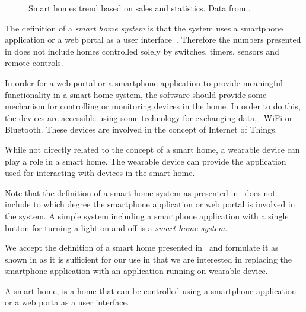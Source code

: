 \begin{figure}[!hbt]
  \centering
  
  \caption{Smart homes trend based on sales and statistics. Data from \protect\cite{SMARTHOMETREND}.}
  \label{fig:smarthomestrend}
\end{figure}

The definition of a \emph{smart home system} is  that the system uses a smartphone application or a web portal as a user interface~\cite{SMARTHOMETREND}. Therefore the numbers presented in  does not include homes controlled solely by switches, timers, sensors and remote controls.

In order for a web portal or a smartphone application to provide meaningful functionality in a smart home system, the software should provide some mechanism for controlling or monitoring devices in the home. In order to do this, the devices are accessible using some technology for exchanging data, \eg~WiFi or Bluetooth. These devices are involved in the concept of Internet of Things. 

While not directly related to the concept of a smart home, a wearable device can play a role in a smart home. The wearable device can provide the application used for interacting with devices in the smart home.

Note that the definition of a smart home system as presented in~\cite{SMARTHOMETREND} does not include to which degree the smartphone application or web portal is involved in the system. A simple system including a smartphone application with a single button for turning a light on and off is a \emph{smart home system}.

We accept the definition of a smart home presented in~\cite{SMARTHOMETREND} and formulate it as shown in  as it is sufficient for our use in that we are interested in replacing the smartphone application with an application running on wearable device.

\begin{definition}
\label{def:smarthome}
A smart home, is a home that can be controlled using a smartphone application or a web porta as a user interface.
\end{definition}

